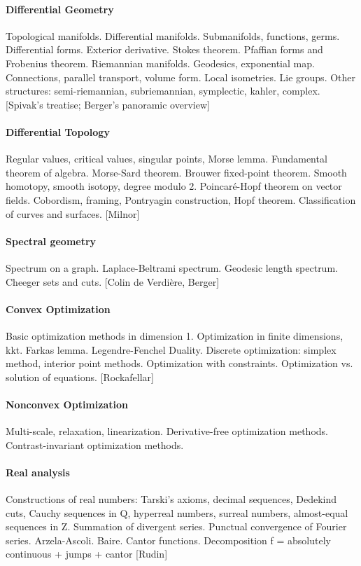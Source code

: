 \paragraph{Differential Geometry}
Topological manifolds.
Differential manifolds.
Submanifolds, functions, germs.
Differential forms.
Exterior derivative.
Stokes theorem.
Pfaffian forms and Frobenius theorem.
Riemannian manifolds.  Geodesics, exponential map.
Connections, parallel transport, volume form.
Local isometries.  Lie groups.
Other structures: semi-riemannian, subriemannian, symplectic, kahler, complex.
[Spivak's treatise; Berger's panoramic overview]

\paragraph{Differential Topology}
Regular values, critical values, singular points, Morse lemma.
Fundamental theorem of algebra.
Morse-Sard theorem.
Brouwer fixed-point theorem.
Smooth homotopy, smooth isotopy, degree modulo 2.
Poincaré-Hopf theorem on vector fields.
Cobordism, framing, Pontryagin construction, Hopf theorem.
Classification of curves and surfaces.
[Milnor]

\paragraph{Spectral geometry}
Spectrum on a graph.
Laplace-Beltrami spectrum.
Geodesic length spectrum.
Cheeger sets and cuts.
[Colin de Verdière, Berger]


\paragraph{Convex Optimization}
Basic optimization methods in dimension 1.
Optimization in finite dimensions, kkt.
Farkas lemma.
Legendre-Fenchel Duality.
Discrete optimization: simplex method, interior point methods.
Optimization with constraints.
Optimization vs. solution of equations.
[Rockafellar]

\paragraph{Nonconvex Optimization}
Multi-scale, relaxation, linearization.
Derivative-free optimization methods.
Contrast-invariant optimization methods.


\paragraph{Real analysis}
Constructions of real numbers: Tarski's axioms, decimal sequences, Dedekind
cuts, Cauchy sequences in Q, hyperreal numbers, surreal numbers, almost-equal
sequences in Z.
Summation of divergent series.
Punctual convergence of Fourier series.
Arzela-Ascoli.  Baire.  Cantor functions.
Decomposition f = absolutely continuous + jumps + cantor
[Rudin]


